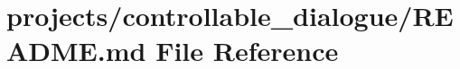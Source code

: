 \hypertarget{projects_2controllable__dialogue_2README_8md}{}\section{projects/controllable\+\_\+dialogue/\+R\+E\+A\+D\+ME.md File Reference}
\label{projects_2controllable__dialogue_2README_8md}
